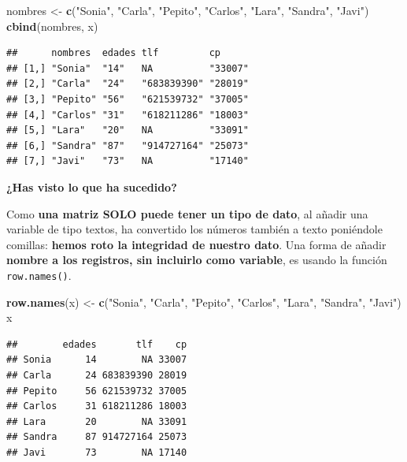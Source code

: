 \documentclass[11pt,]{book}
\newenvironment{Shaded}{\begin{snugshade}}{\end{snugshade}}
\newcommand{\KeywordTok}[1]{\textcolor[rgb]{0.27,0.27,0.27}{\textbf{#1}}}
\newcommand{\NormalTok}[1]{#1}
\newcommand{\StringTok}[1]{\textcolor[rgb]{0.5,0.5,0.5}{#1}}
\begin{document}
\begin{Shaded}
\begin{Highlighting}[]
\NormalTok{nombres <-}\StringTok{ }\KeywordTok{c}\NormalTok{(}\StringTok{"Sonia"}\NormalTok{, }\StringTok{"Carla"}\NormalTok{, }\StringTok{"Pepito"}\NormalTok{, }\StringTok{"Carlos"}\NormalTok{, }\StringTok{"Lara"}\NormalTok{, }\StringTok{"Sandra"}\NormalTok{, }\StringTok{"Javi"}\NormalTok{)}
\KeywordTok{cbind}\NormalTok{(nombres, x)}
\end{Highlighting}
\end{Shaded}

\begin{verbatim}
##      nombres  edades tlf         cp     
## [1,] "Sonia"  "14"   NA          "33007"
## [2,] "Carla"  "24"   "683839390" "28019"
## [3,] "Pepito" "56"   "621539732" "37005"
## [4,] "Carlos" "31"   "618211286" "18003"
## [5,] "Lara"   "20"   NA          "33091"
## [6,] "Sandra" "87"   "914727164" "25073"
## [7,] "Javi"   "73"   NA          "17140"
\end{verbatim}

\textbf{¿Has visto lo que ha sucedido?}

Como \textbf{una matriz SOLO puede tener un tipo de dato}, al añadir una variable de tipo textos, ha convertido los números también a texto poniéndole comillas: \textbf{hemos roto la integridad de nuestro dato}. Una forma de añadir \textbf{nombre a los registros, sin incluirlo como variable}, es usando la función \texttt{row.names()}.

\begin{Shaded}
\begin{Highlighting}[]
\KeywordTok{row.names}\NormalTok{(x) <-}\StringTok{ }\KeywordTok{c}\NormalTok{(}\StringTok{"Sonia"}\NormalTok{, }\StringTok{"Carla"}\NormalTok{, }\StringTok{"Pepito"}\NormalTok{, }\StringTok{"Carlos"}\NormalTok{, }\StringTok{"Lara"}\NormalTok{, }\StringTok{"Sandra"}\NormalTok{, }\StringTok{"Javi"}\NormalTok{)}
\NormalTok{x}
\end{Highlighting}
\end{Shaded}

\begin{verbatim}
##        edades       tlf    cp
## Sonia      14        NA 33007
## Carla      24 683839390 28019
## Pepito     56 621539732 37005
## Carlos     31 618211286 18003
## Lara       20        NA 33091
## Sandra     87 914727164 25073
## Javi       73        NA 17140
\end{verbatim}

~
\end{document}
